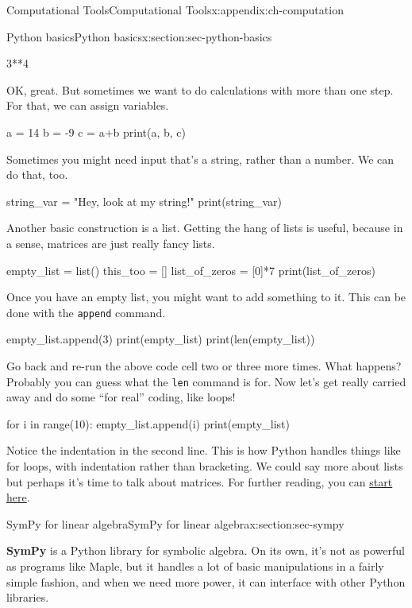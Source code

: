 \documentclass[oneside,10pt,]{book}
\newcommand{\mono}[1]{\texttt{#1}}
\newcommand{\terminology}[1]{\textbf{#1}}
\numberwithin{equation}{section}
\begin{document}
\begin{appendixptx}{Computational Tools}{}{Computational Tools}{}{}{x:appendix:ch-computation}
\begin{sectionptx}{Python basics}{}{Python basics}{}{}{x:section:sec-python-basics}
\begin{sageinput}
3**4
\end{sageinput}
OK, great. But sometimes we want to do calculations with more than one step. For that, we can assign variables.%
\begin{sageinput}
a = 14
b = -9
c = a+b
print(a, b, c)
\end{sageinput}
Sometimes you might need input that's a string, rather than a number. We can do that, too.%
\begin{sageinput}
string_var = "Hey, look at my string!"
print(string_var)
\end{sageinput}
Another basic construction is a list. Getting the hang of lists is useful, because in a sense, matrices are just really fancy lists.%
\begin{sageinput}
empty_list = list()
this_too = []
list_of_zeros = [0]*7
print(list_of_zeros)
\end{sageinput}
Once you have an empty list, you might want to add something to it. This can be done with the \mono{append} command.%
\begin{sageinput}
empty_list.append(3)
print(empty_list)
print(len(empty_list))
\end{sageinput}
Go back and re-run the above code cell two or three more times. What happens? Probably you can guess what the \mono{len} command is for. Now let's get really carried away and do some ``for real'' coding, like loops!%
\begin{sageinput}
for i in range(10):
    empty_list.append(i)
print(empty_list)
\end{sageinput}
Notice the indentation in the second line. This is how Python handles things like for loops, with indentation rather than bracketing. We could say more about lists but perhaps it's time to talk about matrices. For further reading, you can \href{https://developers.google.com/edu/python/lists}{start here}.%
\end{sectionptx}
%
%
\typeout{************************************************}
\typeout{************************************************}
%
\begin{sectionptx}{SymPy for linear algebra}{}{SymPy for linear algebra}{}{}{x:section:sec-sympy}
\begin{introduction}{}%
\terminology{SymPy} is a Python library for symbolic algebra. On its own, it's not as powerful as programs like Maple, but it handles a lot of basic manipulations in a fairly simple fashion, and when we need more power, it can interface with other Python libraries.%

\end{introduction}
\end{sectionptx}
\end{appendixptx}
\end{document}
